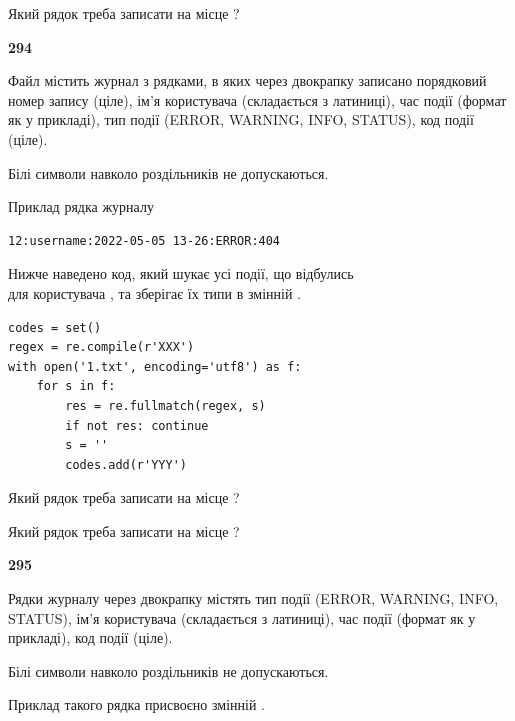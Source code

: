 Який рядок треба записати на місце  ?\par


\newpage

{\begin {center}\textbf{ 294}\end {center}}\par
Файл  містить журнал з рядками, в яких через двокрапку записано поряд\-ко\-вий номер запису (ціле), ім'я користувача (складається з латиниці), час події (фор\-мат як у прикладі), тип події (ERROR, WARNING, INFO, STATUS), код події (ціле).

Білі символи навколо роздільників не допускаються.

Приклад рядка журналу



\begin{verbatim}
12:username:2022-05-05 13-26:ERROR:404
\end{verbatim}


Нижче наведено код, який шукає усі події, що відбулись\\ для користувача , та зберігає їх типи в змінній .



\begin{verbatim}
codes = set()
regex = re.compile(r'XXX')
with open('1.txt', encoding='utf8') as f:
    for s in f:
        res = re.fullmatch(regex, s)
        if not res: continue
        s = ''
        codes.add(r'YYY')
\end{verbatim}





Який рядок треба записати на місце  ?\par
\vspace{5mm}


Який рядок треба записати на місце  ?\par


\newpage

{\begin {center}\textbf{ 295}\end {center}}\par
Рядки журналу через двокрапку містять тип події (ERROR, WARNING, INFO, STATUS), ім'я користувача (складається з латиниці), час події (фор\-мат як у прикладі), код події (ціле).

Білі символи навколо роздільників не допускаються.

Приклад такого рядка присвоєно змінній .



